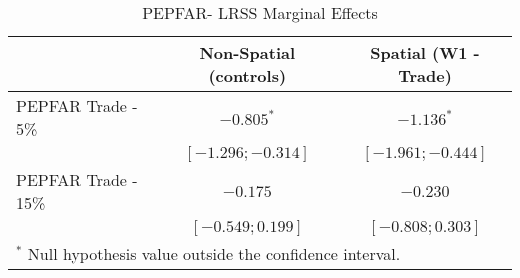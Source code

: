 
\usepackage{booktabs}

\begin{table}
\begin{center}
\begin{tabular}{l c c}
\toprule
 & Non-Spatial (controls) & Spatial (W1 - Trade) \\
\midrule
PEPFAR Trade - 5\%  & $-0.805^{*}$        & $-1.136^{*}$        \\
                    & $ [-1.296; -0.314]$ & $ [-1.961; -0.444]$ \\
PEPFAR Trade - 15\% & $-0.175$            & $-0.230$            \\
                    & $ [-0.549;  0.199]$ & $ [-0.808;  0.303]$ \\
\bottomrule
\multicolumn{3}{l}{\scriptsize{$^*$ Null hypothesis value outside the confidence interval.}}
\end{tabular}
\caption{PEPFAR- LRSS Marginal Effects}
\label{table:maringal-pepfar}
\end{center}
\end{table}
